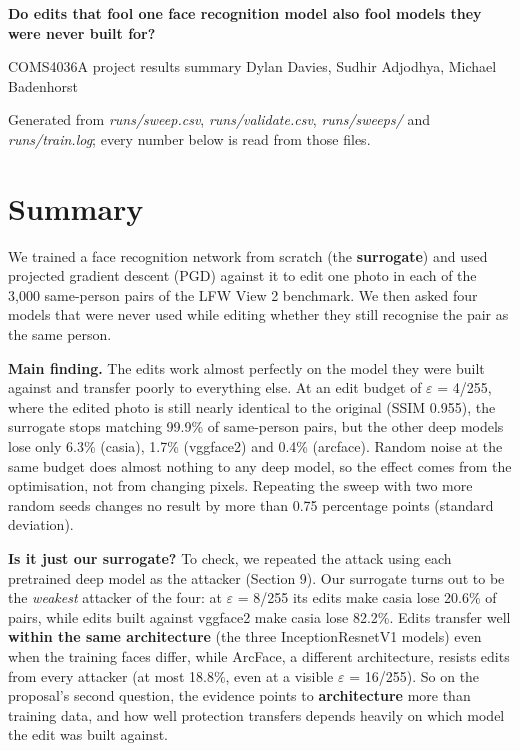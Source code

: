 \documentclass[10pt,a4paper]{article}
\begin{document}
\begin{center}{\LARGE\bfseries Do edits that fool one face recognition model also fool models they were never built for?\par}\end{center}

\begin{center}\color{subtle}COMS4036A project \textperiodcentered{} results summary \textperiodcentered{} Dylan Davies, Sudhir Adjodhya, Michael Badenhorst\end{center}

\begin{center}\color{subtle}Generated from \emph{runs/sweep.csv}, \emph{runs/validate.csv}, \emph{runs/sweeps/} and \emph{runs/train.log}; every number below is read from those files.\end{center}

\section{Summary}

We trained a face recognition network from scratch (the \textbf{surrogate}) and used projected gradient descent (PGD) against it to edit one photo in each of the 3,000 same-person pairs of the LFW View 2 benchmark. We then asked four models that were never used while editing whether they still recognise the pair as the same person.


\textbf{Main finding.} The edits work almost perfectly on the model they were built against and transfer poorly to everything else. At an edit budget of $\varepsilon$ = 4/255, where the edited photo is still nearly identical to the original (SSIM 0.955), the surrogate stops matching 99.9\% of same-person pairs, but the other deep models lose only 6.3\% (casia), 1.7\% (vggface2) and 0.4\% (arcface). Random noise at the same budget does almost nothing to any deep model, so the effect comes from the optimisation, not from changing pixels. Repeating the sweep with two more random seeds changes no result by more than 0.75 percentage points (standard deviation).


\textbf{Is it just our surrogate?} To check, we repeated the attack using each pretrained deep model as the attacker (Section 9). Our surrogate turns out to be the \emph{weakest} attacker of the four: at $\varepsilon$ = 8/255 its edits make casia lose 20.6\% of pairs, while edits built against vggface2 make casia lose 82.2\%. Edits transfer well \textbf{within the same architecture} (the three InceptionResnetV1 models) even when the training faces differ, while ArcFace, a different architecture, resists edits from every attacker (at most 18.8\%, even at a visible $\varepsilon$ = 16/255). So on the proposal's second question, the evidence points to \textbf{architecture} more than training data, and how well protection transfers depends heavily on which model the edit was built against.
\end{document}
